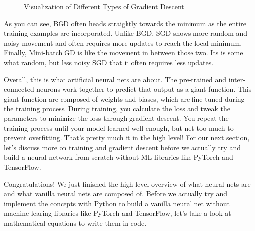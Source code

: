 \documentclass[../../main.tex]{subfiles}
\begin{document}
\begin{figure}[H]
\caption{Visualization of Different Types of Gradient Descent}
\end{figure}

As you can see, BGD often heads straightly towards the minimum
as the entire training examples are incorporated. Unlike BGD,
SGD shows more random and noisy movement and often requires more
updates to reach the local minimum. Finally, Mini-batch GD is
like the movement in between those two. Its is some what random,
but less noisy SGD that it often requires less updates.

Overall, this is what artificial neural nets are about.
The pre-trained and inter-connected neurons work together to
predict that output as a giant function. This giant function are
composed of weights and biases, which are fine-tuned during the
training process. During training, you calculate the loss and
tweak the parameters to minimize the loss through gradient descent.
You repeat the training process until your model learned well enough,
but not too much to prevent overfitting. That's pretty much it in
the high level! For our next section, let's discuss more on training
and gradient descent before we actually try and build a neural
network from scratch without ML libraries like PyTorch and TensorFlow.

Congratulations! We just finished the high level overview of what
neural nets are and what vanilla neural nets are composed of.
Before we actually try and implement the concepts with Python to
build a vanilla neural net without machine learing libraries like
PyTorch and TensorFlow, let's take a look at mathematical equations
to write them in code.
\end{document}
